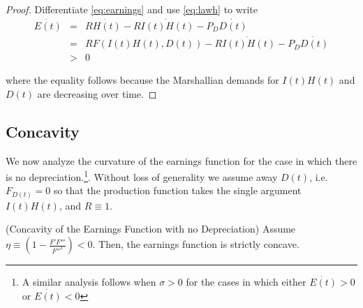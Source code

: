 \begin{proof}
Differentiate \eqref{eq:earnings} and use \eqref{eq:lawh} to write
\begin{eqnarray}
\dot{E(t)} &=& R \dot{H(t)} - R \dot{I(t)H(t)} - P_{D} \dot{D(t)} \nonumber \\
           &=& R F \left( I(t) H(t), D(t) \right) - R \dot{I(t)H(t)} - P_{D} \dot{D(t)} \nonumber \\     
           &>& 0 
\end{eqnarray}

\noindent where the equality follows because the Marshallian demands for $I(t)H(t)$ and $D(t)$ are decreasing over time.
\end{proof}

\subsection{Concavity} \label{section:egdyn}
\indent We now analyze the curvature of the earnings function for the case in which there is no depreciation.\footnote{A similar analysis follows when $\sigma>0$ for the cases in which either $\dot{E(t)}> 0$ or $\dot{E(t)}< 0$}. Without loss of generality we assume away $D(t)$, i.e. $F_{D(t)} = 0 $ so that the production function takes the single argument $I(t) H(t)$, and $R \equiv 1$. 

\begin{claim} (Concavity of the Earnings Function with no Depreciation) \label{claim:concearnnodep}
Assume $\eta \equiv \left( 1 - \frac{F'F'''}{{F''}^2} \right) < 0$. Then, the earnings function is strictly concave. 
\end{claim}


